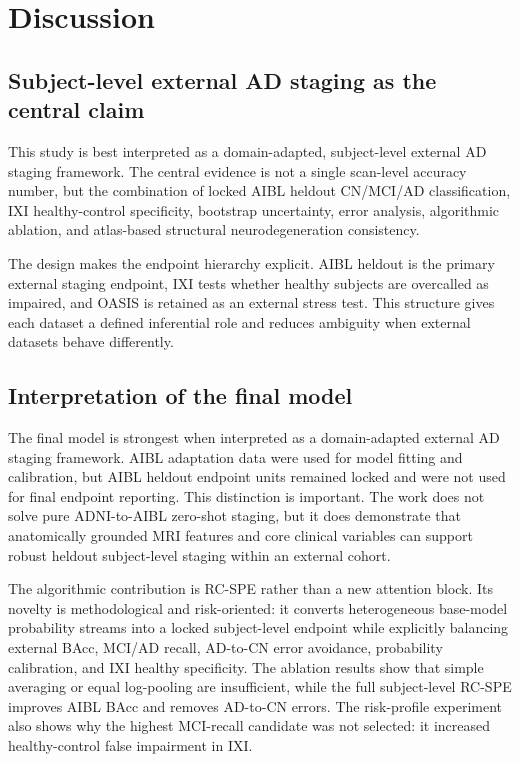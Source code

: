 \section{Discussion}
\label{sec:discussion}

\subsection{Subject-level external AD staging as the central claim}
\label{sec:discussion_rebuild}

This study is best interpreted as a domain-adapted, subject-level external AD staging framework. The central evidence is not a single scan-level accuracy number, but the combination of locked AIBL heldout CN/MCI/AD classification, IXI healthy-control specificity, bootstrap uncertainty, error analysis, algorithmic ablation, and atlas-based structural neurodegeneration consistency.

The design makes the endpoint hierarchy explicit. AIBL heldout is the primary external staging endpoint, IXI tests whether healthy subjects are overcalled as impaired, and OASIS is retained as an external stress test. This structure gives each dataset a defined inferential role and reduces ambiguity when external datasets behave differently.

\subsection{Interpretation of the final model}
\label{sec:discussion_model}

The final model is strongest when interpreted as a domain-adapted external AD staging framework. AIBL adaptation data were used for model fitting and calibration, but AIBL heldout endpoint units remained locked and were not used for final endpoint reporting. This distinction is important. The work does not solve pure ADNI-to-AIBL zero-shot staging, but it does demonstrate that anatomically grounded MRI features and core clinical variables can support robust heldout subject-level staging within an external cohort.

The algorithmic contribution is RC-SPE rather than a new attention block. Its novelty is methodological and risk-oriented: it converts heterogeneous base-model probability streams into a locked subject-level endpoint while explicitly balancing external BAcc, MCI/AD recall, AD-to-CN error avoidance, probability calibration, and IXI healthy specificity. The ablation results show that simple averaging or equal log-pooling are insufficient, while the full subject-level RC-SPE improves AIBL BAcc and removes AD-to-CN errors. The risk-profile experiment also shows why the highest MCI-recall candidate was not selected: it increased healthy-control false impairment in IXI.

